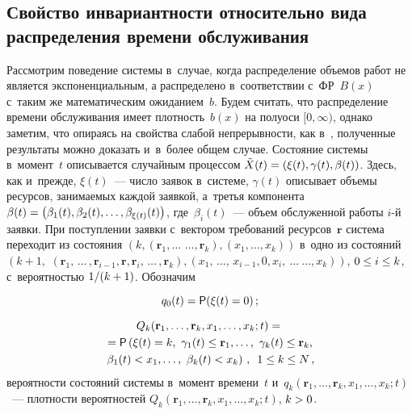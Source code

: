 \begin{multicols}{2}
\vspace*{-9pt}
  
\section{Свойство инвариантности относительно вида 
распределения времени обслуживания}

\vspace*{-2pt}

  Рассмотрим поведение системы в~случае, когда распределение объемов 
работ не является экспоненциальным, а распределено в~соответствии 
с~ФР~$B(x)$ с~таким же математическим ожиданием~$b$. Будем считать, 
что распределение времени обслуживания имеет плотность~$b(x)$ на 
полуоси $[0,\infty)$, однако заметим, что опираясь на свойства слабой 
непрерывности, как в~\cite{8-sop}, полученные результаты можно доказать 
и~в~более общем случае. Состояние системы в~момент~$t$ описывается 
случайным процессом $\tilde{X}(t)\hm= (\xi(t), \gamma(t), \beta(t))$. Здесь, как 
и~прежде, $\xi(t)$~--- число заявок в~сис\-те\-ме, $\gamma(t)$ описывает объемы 
ресурсов, занимаемых каждой заявкой, а~\mbox{третья} компонента $\beta(t)\hm= 
\left( \beta_1(t), \beta_2(t),\ldots , \beta_{\xi(t)}(t)\right)$, где~$\beta_i(t)$~--- 
объем обслуженной работы $i$-й заявки. При поступлении заявки с~вектором 
требований ресурсов~$\mathbf{r}$ система переходит из состояния $\left( k, 
\left( \mathbf{r}_1,\ldots\right.\right.$\linebreak
$\left.\left.\ldots, \mathbf{r}_k\right), \left( x_1, \ldots , x_k\right)\right)$ 
в~одно из состояний $\left( k+1,\right.$\linebreak
$\left. \left( \mathbf{r}_1,\, \ldots\, , \mathbf{r}_{i-1}, 
\mathbf{r}, \mathbf{r}_i,\, \ldots\, , \mathbf{r}_k\right), \left( x_1,\, \ldots,\, x_{i-1}, 0, 
 x_i,\  \ldots\ \right.\right.$\linebreak $\left.\left.\ldots, x_k\right)\right)$, $0\hm\leq i\hm\leq k$, с~вероятностью 
$1/(k\hm+1)$. Обозначим 

\noindent
  \begin{equation}
  q_0(t)={\sf P}(\xi(t)=0)\,;\label{e5-sop}
  \end{equation}
  
  \vspace*{-12pt}
  
  \noindent
  \begin{multline}
  Q_k(\mathbf{r}_1,\ldots, \mathbf{r}_k, x_1, \ldots , x_k;t) ={}\\
  {}={\sf P}\left( \xi(t)=k,\ 
\gamma_1(t)\leq \mathbf{r}_1,\ldots ,\ \gamma_k(t)\leq \mathbf{r}_k,\right.\\
 \left.
  \beta_1(t)<x_1,\ldots ,\ \beta_k(t)<x_k\right)\,,\enskip
  1\leq k\leq N\,,
  \label{e6-sop}
  \end{multline}
вероятности состояний системы в~момент времени~$t$ 
и~$q_k(\mathbf{r}_1,\ldots, \mathbf{r}_k, x_1,\ldots , x_k;t)$~--- плотности 
вероятностей $Q_k(\mathbf{r}_1,\ldots, \mathbf{r}_k, x_1, \ldots , x_k;t)$, 
$k\hm>0$.


\end{multicols}

